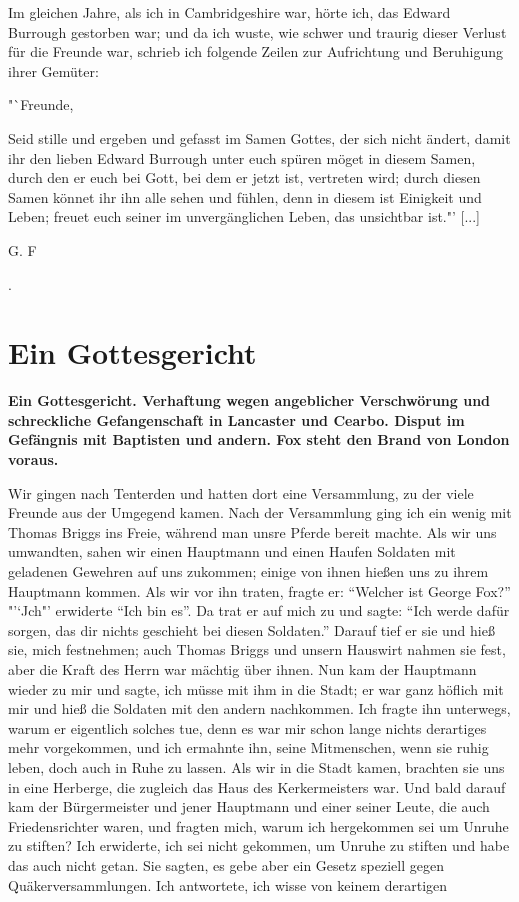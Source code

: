 Im gleichen Jahre, als ich in Cambridgeshire war, hörte ich,
das Edward Burrough gestorben war; und da ich wuste, wie
schwer und traurig dieser Verlust für die Freunde war, schrieb
ich folgende Zeilen zur Aufrichtung und Beruhigung ihrer Gemüter:

"`Freunde,

Seid stille und ergeben und gefasst im Samen Gottes, der
sich nicht ändert, damit ihr den lieben Edward Burrough unter
euch spüren möget in diesem Samen, durch den er euch bei Gott,
bei dem er jetzt ist, vertreten wird; durch diesen Samen könnet
ihr ihn alle sehen und fühlen, denn in diesem ist Einigkeit und
Leben; freuet euch seiner im unvergänglichen Leben, das 
unsichtbar ist."' [...] 
\begin{flushright}G. F\end{flushright}.

\chapter[Ein Gottesgericht]{Ein Gottesgericht}

\begin{center}
\textbf{Ein Gottesgericht. Verhaftung wegen angeblicher Verschwörung
und schreckliche Gefangenschaft in Lancaster und Cearbo. Disput
im Gefängnis mit Baptisten und andern. Fox steht den Brand
von London voraus.}
\end{center}

Wir gingen nach Tenterden und hatten dort eine Versammlung, 
zu der viele Freunde aus der Umgegend kamen. Nach der
Versammlung ging ich ein wenig mit Thomas Briggs ins Freie,
während man unsre Pferde bereit machte. Als wir uns umwandten, 
sahen wir einen Hauptmann und einen Haufen Soldaten
mit geladenen Gewehren auf uns zukommen; einige von ihnen
hießen uns zu ihrem Hauptmann kommen. Als wir vor ihn
traten, fragte er: "`Welcher ist George Fox?"' "'`Jch"' erwiderte
"`Ich bin es"'. Da trat er auf mich zu und sagte: "`Ich werde
dafür sorgen, das dir nichts geschieht bei diesen Soldaten."' 
Darauf tief er sie und hieß sie, mich festnehmen; auch Thomas
Briggs und unsern Hauswirt nahmen sie fest, aber die Kraft des
Herrn war mächtig über ihnen. Nun kam der Hauptmann
wieder zu mir und sagte, ich müsse mit ihm in die Stadt;
er war ganz höflich mit mir und hieß die Soldaten mit den
andern nachkommen. Ich fragte ihn unterwegs, warum er
eigentlich solches tue, denn es war mir schon lange nichts 
derartiges mehr vorgekommen, und ich ermahnte ihn, seine Mitmenschen,
wenn sie ruhig leben, doch auch in Ruhe zu lassen. Als wir in
die Stadt kamen, brachten sie uns in eine Herberge, die zugleich
das Haus des Kerkermeisters war. Und bald darauf kam der
Bürgermeister und jener Hauptmann und einer seiner Leute, die
auch Friedensrichter waren, und fragten mich, warum ich 
hergekommen sei um Unruhe zu stiften? Ich erwiderte, ich sei nicht
gekommen, um Unruhe zu stiften und habe das auch nicht getan.
Sie sagten, es gebe aber ein Gesetz speziell gegen 
Quäkerversammlungen. Ich antwortete, ich wisse von keinem derartigen